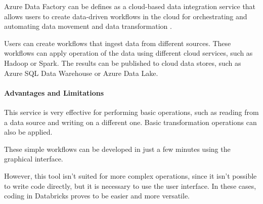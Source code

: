 Azure Data Factory can be defines as a cloud-based data integration service that allows users to create data-driven workflows in the cloud for orchestrating and automating data movement and data transformation \cite{bib:azure:datafactory:intro}.

Users can create workflows that ingest data from different sources.
These workflows can apply operation of the data using different cloud services, such as Hadoop or Spark.
The results can be published to cloud data stores, such as Azure SQL Data Warehouse or Azure Data Lake.

\paragraph{Advantages and Limitations}
    This service is very effective for performing basic operations, such as reading from a data source and writing on a different one.
    Basic transformation operations can also be applied.
    
    These simple workflows can be developed in just a few minutes using the graphical interface.
    
    However, this tool isn't suited for more complex operations, since it isn't possible to write code directly, but it is necessary to use the user interface.
    In these cases, coding in Databricks proves to be easier and more versatile.
